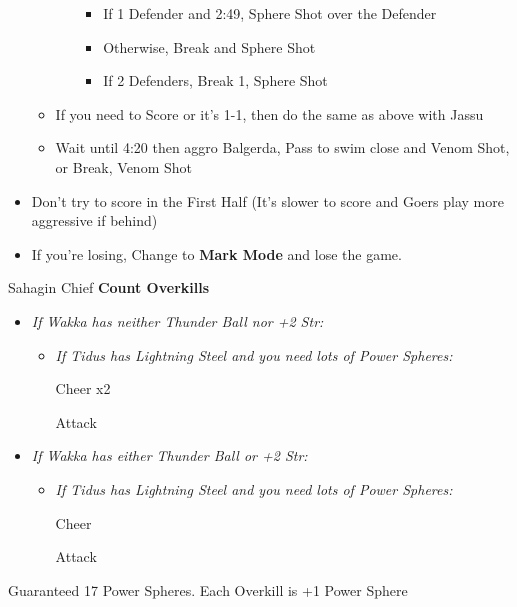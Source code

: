\begin{blitzball}
\begin{itemize}
\begin{itemize}
\begin{itemize}
                \begin{itemize}
                    \item If 1 Defender and 2:49, Sphere Shot over the Defender
                    \item Otherwise, Break and Sphere Shot
                    \item If 2 Defenders, Break 1, Sphere Shot
                \end{itemize}
            \end{itemize}
            \item If you need to Score or it's 1-1, then do the same as above with Jassu
            \item Wait until 4:20 then aggro Balgerda, Pass to \wakka
            \wakkaf swim close and Venom Shot, or Break, Venom Shot
        \end{itemize}
        \item Don't try to score in the First Half (It's slower to score and Goers play more aggressive if behind)
        \item If you're losing, Change to \textbf{Mark Mode} and lose the game.
    \end{itemize}
\end{blitzball}
\begin{battle}{Sahagin Chief}
    \textbf{Count Overkills}
    \begin{itemize}
        \item \textit{If Wakka has neither Thunder Ball nor +2 Str:}
        \begin{itemize}
            \tidusf Haste \tidus
            \wakkaf For the first two waves Attack Sahagin C
            \wakkaf For the third wave Potion \tidus\ if he has less than 156 HP, otherwise Defend
            \item \textit{If Tidus has Lightning Steel and you need lots of Power Spheres:}
            \begin{itemize}
                \tidusf Cheer x2
            \end{itemize}
            \tidusf Attack
        \end{itemize}
        \item \textit{If Wakka has either Thunder Ball or +2 Str:}
        \begin{itemize}
            \tidusf Cheer
            \wakkaf Attack
            \tidusf Haste \tidus
            \tidusf Haste \wakka
            \item \textit{If Tidus has Lightning Steel and you need lots of Power Spheres:}
            \begin{itemize}
                \tidusf Cheer
            \end{itemize}
            \tidusf Attack
        \end{itemize}
    \end{itemize}
    Guaranteed 17 Power Spheres. Each Overkill is +1 Power Sphere
\end{battle}
